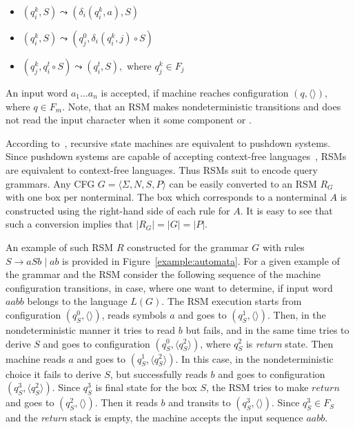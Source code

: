 \begin{itemize}
    \item $(q_i^k,S) \leadsto (\delta_i (q_i^k, a),S)$
    \item $(q_i^k,S) \leadsto (q_j^0, \delta_i (q_i^k, j) \circ S)$
    \item $(q_j^k,q_i^t\circ S) \leadsto (q_i^t, S),$ where $q_j^k \in F_j$ 
\end{itemize}

An input word $a_1 \dots a_n$ is accepted, if machine reaches configuration $(q,\langle\rangle)$, where $q \in F_m$.
Note, that an RSM makes nondeterministic transitions and does not read the input character when it  some component or .

According to~\cite{rsm:analysis:10.1007/3-540-44585-4_18}, recursive state machines are equivalent to pushdown systems.
Since pushdown systems are capable of accepting context-free languages~\cite{automata:theory:10.5555/1177300}, RSMs are equivalent to context-free languages.
Thus RSMs suit to encode query grammars.
Any CFG $G=\langle\Sigma, N, S, P\rangle$ can be easily converted to an RSM $R_G$ with one box per nonterminal.
The box which corresponds to a nonterminal $A$ is constructed using the right-hand side of each rule for $A$.
It is easy to see that such a conversion implies that $|R_G| = |G| = |P|$.

An example of such RSM $R$ constructed for the grammar $G$ with rules $S \to a S b \mid a b$ is provided in Figure~\ref{example:automata}. 
For a given example of the grammar and the RSM consider the following sequence of the machine configuration transitions, in case, where one want to determine, if input word $aabb$ belongs to the language $L(G)$. 
The RSM execution starts from configuration $(q_S^0,\langle \rangle)$, reads symbols $a$ and goes to $(q_S^1, \langle \rangle)$. 
Then, in the nondeterministic manner it tries to read $b$ but fails, and in the same time tries to derive $S$ and goes to configuration $(q_S^0, \langle q_S^2 \rangle)$, where $q_S^2$ is \textit{return} state. 
Then machine reads $a$ and goes to $(q_S^1, \langle q_S^2 \rangle)$. In this case, in the nondeterministic choice it fails to derive $S$, but successfully reads $b$ and goes to configuration $(q_S^3,\langle q_S^2 \rangle)$. 
Since $q_S^3$ is final state for the box $S$, the RSM tries to make $return$ and goes to $(q_S^2,\langle \rangle)$. 
Then it reads $b$ and transits to $(q_S^3,\langle \rangle)$. 
Since $q_S^3 \in F_S$ and the \textit{return} stack is empty, the machine accepts the input sequence $aabb$.

